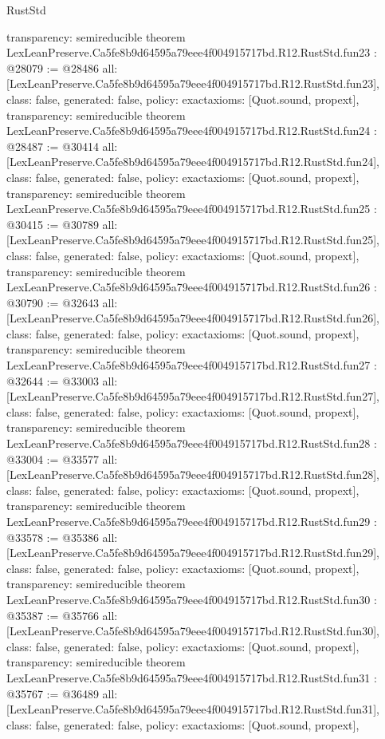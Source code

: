\begin{lexlean}{RustStd}
\begin{coremodule}
{  transparency: semireducible
}
theorem LexLeanPreserve.Ca5fe8b9d64595a79eee4f004915717bd.R12.RustStd.fun23 : @28079 := @28486 {
  all: [LexLeanPreserve.Ca5fe8b9d64595a79eee4f004915717bd.R12.RustStd.fun23],
  class: false,
  generated: false,
  policy: exact{axioms: [Quot.sound, propext]},
  transparency: semireducible
}
theorem LexLeanPreserve.Ca5fe8b9d64595a79eee4f004915717bd.R12.RustStd.fun24 : @28487 := @30414 {
  all: [LexLeanPreserve.Ca5fe8b9d64595a79eee4f004915717bd.R12.RustStd.fun24],
  class: false,
  generated: false,
  policy: exact{axioms: [Quot.sound, propext]},
  transparency: semireducible
}
theorem LexLeanPreserve.Ca5fe8b9d64595a79eee4f004915717bd.R12.RustStd.fun25 : @30415 := @30789 {
  all: [LexLeanPreserve.Ca5fe8b9d64595a79eee4f004915717bd.R12.RustStd.fun25],
  class: false,
  generated: false,
  policy: exact{axioms: [Quot.sound, propext]},
  transparency: semireducible
}
theorem LexLeanPreserve.Ca5fe8b9d64595a79eee4f004915717bd.R12.RustStd.fun26 : @30790 := @32643 {
  all: [LexLeanPreserve.Ca5fe8b9d64595a79eee4f004915717bd.R12.RustStd.fun26],
  class: false,
  generated: false,
  policy: exact{axioms: [Quot.sound, propext]},
  transparency: semireducible
}
theorem LexLeanPreserve.Ca5fe8b9d64595a79eee4f004915717bd.R12.RustStd.fun27 : @32644 := @33003 {
  all: [LexLeanPreserve.Ca5fe8b9d64595a79eee4f004915717bd.R12.RustStd.fun27],
  class: false,
  generated: false,
  policy: exact{axioms: [Quot.sound, propext]},
  transparency: semireducible
}
theorem LexLeanPreserve.Ca5fe8b9d64595a79eee4f004915717bd.R12.RustStd.fun28 : @33004 := @33577 {
  all: [LexLeanPreserve.Ca5fe8b9d64595a79eee4f004915717bd.R12.RustStd.fun28],
  class: false,
  generated: false,
  policy: exact{axioms: [Quot.sound, propext]},
  transparency: semireducible
}
theorem LexLeanPreserve.Ca5fe8b9d64595a79eee4f004915717bd.R12.RustStd.fun29 : @33578 := @35386 {
  all: [LexLeanPreserve.Ca5fe8b9d64595a79eee4f004915717bd.R12.RustStd.fun29],
  class: false,
  generated: false,
  policy: exact{axioms: [Quot.sound, propext]},
  transparency: semireducible
}
theorem LexLeanPreserve.Ca5fe8b9d64595a79eee4f004915717bd.R12.RustStd.fun30 : @35387 := @35766 {
  all: [LexLeanPreserve.Ca5fe8b9d64595a79eee4f004915717bd.R12.RustStd.fun30],
  class: false,
  generated: false,
  policy: exact{axioms: [Quot.sound, propext]},
  transparency: semireducible
}
theorem LexLeanPreserve.Ca5fe8b9d64595a79eee4f004915717bd.R12.RustStd.fun31 : @35767 := @36489 {
  all: [LexLeanPreserve.Ca5fe8b9d64595a79eee4f004915717bd.R12.RustStd.fun31],
  class: false,
  generated: false,
  policy: exact{axioms: [Quot.sound, propext]},
}
\end{coremodule}
\end{lexlean}
